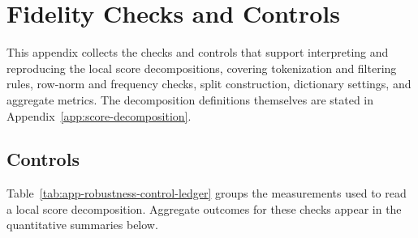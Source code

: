 \section{Fidelity Checks and Controls}
\label{app:robustness-controls}

This appendix collects the checks and controls that support interpreting and reproducing the local
score decompositions, covering tokenization and filtering rules, row-norm and frequency checks,
split construction, dictionary settings, and aggregate metrics. The decomposition
definitions themselves are stated in Appendix~\ref{app:score-decomposition}.

\subsection{Controls}
\label{app:robustness-summary}

Table~\ref{tab:app-robustness-control-ledger} groups the measurements used to
read a local score decomposition. Aggregate outcomes for these checks appear
in the quantitative summaries below.

